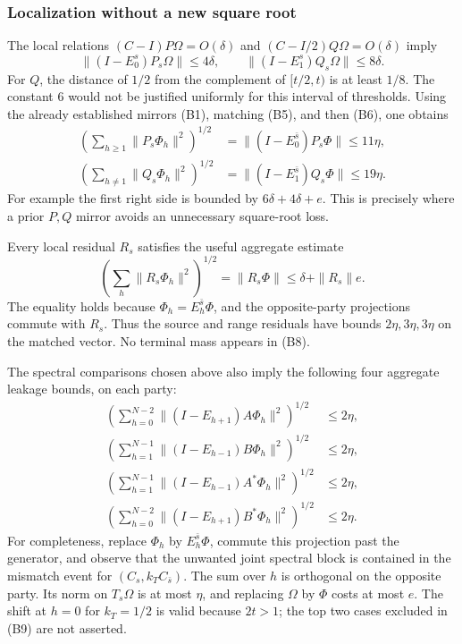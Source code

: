 \subsubsection{Localization without a new square root}
The local relations $(C-I)P\Omega=O(\delta)$ and
$(C-I/2)Q\Omega=O(\delta)$ imply
\[
 \|(I-E_0^s)P_s\Omega\|\leq4\delta,\qquad
 \|(I-E_1^s)Q_s\Omega\|\leq8\delta.              \tag{B6}
\]
For $Q$, the distance of $1/2$ from the complement of
$[t/2,t)$ is at least $1/8$.  The constant $6$ would not be justified
uniformly for this interval of thresholds.
Using the already established mirrors (B1), matching (B5), and then (B6),
one obtains
\begin{align}
 \left(\sum_{h\geq1}\|P_s\Phi_h\|^2\right)^{1/2}
 &=\|(I-E_0^{\bar s})P_s\Phi\|\leq11\eta,\\
 \left(\sum_{h\ne1}\|Q_s\Phi_h\|^2\right)^{1/2}
 &=\|(I-E_1^{\bar s})Q_s\Phi\|\leq19\eta.       \tag{B7}
\end{align}
For example the first right side is bounded by
$6\delta+4\delta+e$.  This is precisely where a prior $P,Q$ mirror
avoids an unnecessary square-root loss.

Every local residual $R_s$ satisfies the useful aggregate estimate
\[
 \left(\sum_h\|R_s\Phi_h\|^2\right)^{1/2}
 =\|R_s\Phi\|\leq\delta+\|R_s\|e.             \tag{B8}
\]
The equality holds because $\Phi_h=E_h^{\bar s}\Phi$, and the
opposite-party projections commute with $R_s$.  Thus the source and
range residuals have bounds $2\eta,3\eta,3\eta$ on the matched vector.
No terminal mass appears in (B8).

The spectral comparisons chosen above also imply the following four
aggregate leakage bounds, on each party:
\begin{align}
 \left(\sum_{h=0}^{N-2}
 \|(I-E_{h+1})A\Phi_h\|^2\right)^{1/2}&\leq2\eta,\\
 \left(\sum_{h=1}^{N-1}
 \|(I-E_{h-1})B\Phi_h\|^2\right)^{1/2}&\leq2\eta,\\
 \left(\sum_{h=1}^{N-1}
 \|(I-E_{h-1})A^*\Phi_h\|^2\right)^{1/2}&\leq2\eta,\\
 \left(\sum_{h=0}^{N-2}
 \|(I-E_{h+1})B^*\Phi_h\|^2\right)^{1/2}&\leq2\eta. \tag{B9}
\end{align}
For completeness, replace $\Phi_h$ by $E_h^{\bar s}\Phi$, commute this
projection past the generator, and observe that the unwanted joint
spectral block is contained in the mismatch event for
$(C_s,k_TC_{\bar s})$.  The sum over $h$ is orthogonal on the opposite
party.  Its norm on $T_s\Omega$ is at most $\eta$, and replacing
$\Omega$ by $\Phi$ costs at most $e$.  The shift at $h=0$ for
$k_T=1/2$ is valid because $2t>1$; the top two cases excluded in (B9)
are not asserted.

